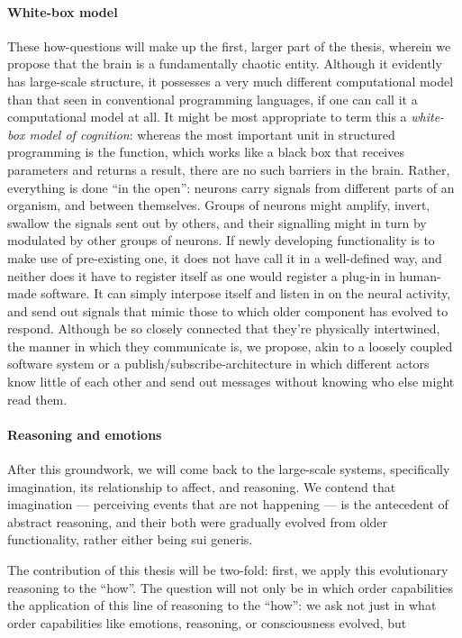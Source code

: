 \paragraph{White-box model} These how-questions will make up the first, larger part of the thesis, wherein we propose that the brain is a fundamentally chaotic entity. Although it evidently has large-scale structure, it possesses a very much different computational model than that seen in conventional programming languages, if one can call it a computational model at all. It might be most appropriate to term this a {\em white-box model of cognition}: whereas the most important unit in structured programming is the function, which works like a black box that receives parameters and returns a result, there are no such barriers in the brain. Rather, everything is done ``in the open'': neurons carry signals from different parts of an organism, and between themselves. Groups of neurons might amplify, invert, swallow the signals sent out by others, and their signalling might in turn by modulated by other groups of neurons. If newly developing functionality is to make use of pre-existing one, it does not have call it in a well-defined way, and neither does it have to register itself as one would register a plug-in in human-made software. It can simply interpose itself and listen in on the neural activity, and send out signals that mimic those to which older component has evolved to respond. Although be so closely connected that they're physically intertwined, the manner in which they communicate is, we propose, akin to a loosely coupled software system or a publish/subscribe-architecture in which different actors know little of each other and send out messages without knowing who else might read them.

\paragraph{Reasoning and emotions} After this groundwork, we will come back to the large-scale systems, specifically imagination, its relationship to affect, and reasoning. We contend that imagination --- perceiving events that are not happening --- is the antecedent of abstract reasoning, and their both were gradually evolved from older functionality, rather either being sui generis.



\vspace{3cm}

The contribution of this thesis will be two-fold: first, we apply this evolutionary reasoning to the ``how''. The question will not only be in which order capabilities
the application of this line of reasoning to the ``how'': we ask not just in what order capabilities like emotions, reasoning, or consciousness evolved, but 

